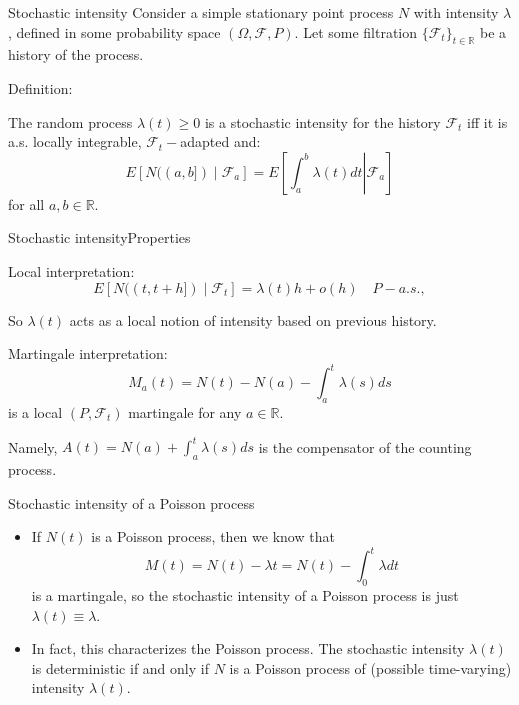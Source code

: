 \documentclass[aspectratio=169]{beamer}
\newcommand{\E}[1]{E\left[#1 \right]}
\newenvironment*{myitem}[1][1.5em]{\begin{itemize}\setlength{\itemsep}{#1}}{\end{itemize}}
\begin{document}
\begin{frame}{Stochastic intensity}
	Consider a simple stationary point process $N$ with intensity $\lambda$, defined in some probability space $(\Omega, \mathcal{F},P)$. Let some filtration $\{\mathcal{F}_t\}_{t\in\mathbb{R}}$ be a \alert{history} of the process.

	\bigskip

	\begin{block}{Definition:}

		The random process $\lambda(t)\geqslant 0$ is a \alert{stochastic intensity} for the history $\mathcal{F}_t$ iff it is a.s. locally integrable, $\mathcal{F}_t-$adapted and:
		\begin{equation*}
			\E{N((a,b])\mid \mathcal{F}_a} = \E{\left.\int_a^b \lambda(t)dt \right| \mathcal{F}_a}
		\end{equation*}
		for all $a,b\in \mathbb{R}$.
	\end{block}

\end{frame}

\begin{frame}{Stochastic intensity}{Properties}

	
	\alert{Local interpretation:}
		\begin{equation*}
			E[N((t,t+h])\mid \mathcal{F}_t] = \lambda(t)h + o(h) \quad P-a.s.,
		\end{equation*}
	
	So $\lambda(t)$ acts as a \alert{local} notion of intensity based on previous history.

	\pause \vfill
	\alert{Martingale interpretation:}
		\begin{equation*}
			M_a(t) = N(t) - N(a) - \int_a^t \lambda(s)ds
		\end{equation*} 
		is a local $(P,\mathcal{F}_t)$ martingale for any $a\in\mathbb{R}$.
	
		\vfill

	Namely, $A(t) = N(a) + \int_a^t \lambda(s)ds$ is the \alert{compensator} of the counting process.

\end{frame}

\begin{frame}{Stochastic intensity of a Poisson process}

	\begin{myitem}[2em]
		\item If $N(t)$ is a Poisson process, then we know that
		\begin{equation*}
			M(t) = N(t) - \lambda t = N(t) - \int_0^t \lambda dt
		\end{equation*}
		is a martingale, so the stochastic intensity of a Poisson process is just $\lambda(t)\equiv \lambda$.

		\pause

		\item In fact, this \alert{characterizes} the Poisson process. The stochastic intensity $\lambda(t)$ is \alert{deterministic} if and only if $N$ is a Poisson process of (possible time-varying) intensity $\lambda(t)$.
	\end{myitem}
\end{frame}
\end{document}
